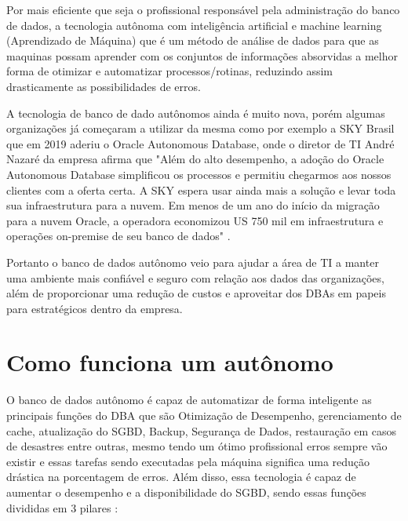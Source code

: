 Por mais eficiente que seja o profissional responsável pela administração do banco de dados, a tecnologia autônoma com inteligência artificial e machine learning (Aprendizado de Máquina) que é um método de análise de dados para que as maquinas possam aprender com os conjuntos de informações absorvidas a melhor forma de otimizar e automatizar processos/rotinas, reduzindo assim drasticamente as possibilidades de erros.


A tecnologia de banco de dado autônomos ainda é muito nova, porém algumas organizações já começaram a utilizar da mesma como por exemplo a SKY Brasil que em 2019 aderiu o Oracle Autonomous Database, onde o diretor de TI André Nazaré da empresa afirma que "Além do alto desempenho, a adoção do Oracle Autonomous Database simplificou os processos e permitiu chegarmos aos nossos clientes com a oferta certa. A SKY espera usar ainda mais a solução e levar toda sua infraestrutura para a nuvem. Em menos de um ano do início da migração para a nuvem Oracle, a operadora economizou US 750 mil em infraestrutura e operações on-premise de seu banco de dados" . \cite{Sky}

Portanto o banco de dados autônomo veio para ajudar a área de TI a manter uma ambiente mais confiável e seguro com relação aos dados das organizações, além de proporcionar uma redução de custos e aproveitar dos DBAs em papeis para estratégicos dentro da empresa.



\section{Como funciona um autônomo}

O banco de dados autônomo é capaz de automatizar de forma inteligente as principais funções do DBA que são Otimização de Desempenho, gerenciamento de cache, atualização do SGBD, Backup, Segurança de Dados, restauração em casos de desastres entre outras, mesmo tendo um ótimo profissional erros sempre vão existir e essas tarefas sendo executadas pela máquina significa uma redução drástica na porcentagem de erros. Além disso, essa tecnologia é capaz de aumentar o desempenho e a disponibilidade do SGBD, sendo essas funções divididas em 3 pilares \cite{OracleDBAutonomo}:


